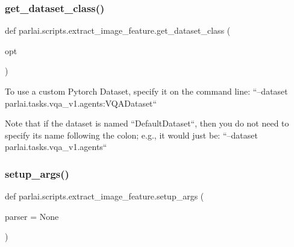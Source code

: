 \mbox{\label{namespaceparlai_1_1scripts_1_1extract__image__feature_a4fa5d8aef45056034f4898531a0f9967}} 
\subsubsection{\texorpdfstring{get\+\_\+dataset\+\_\+class()}{get\_dataset\_class()}}
{\footnotesize\ttfamily def parlai.\+scripts.\+extract\+\_\+image\+\_\+feature.\+get\+\_\+dataset\+\_\+class (\begin{DoxyParamCaption}\item[{}]{opt }\end{DoxyParamCaption})}

\begin{DoxyVerb}To use a custom Pytorch Dataset, specify it on the command line: ``--dataset
parlai.tasks.vqa_v1.agents:VQADataset``

Note that if the dataset is named ``DefaultDataset``, then you do not need to
specify its name following the colon; e.g., it would just be: ``--dataset
parlai.tasks.vqa_v1.agents``
\end{DoxyVerb}
 \mbox{\label{namespaceparlai_1_1scripts_1_1extract__image__feature_ab634fcc65758e30deaf92980edcc20bd}} 
\subsubsection{\texorpdfstring{setup\+\_\+args()}{setup\_args()}}
{\footnotesize\ttfamily def parlai.\+scripts.\+extract\+\_\+image\+\_\+feature.\+setup\+\_\+args (\begin{DoxyParamCaption}\item[{}]{parser = {\ttfamily None} }\end{DoxyParamCaption})}

